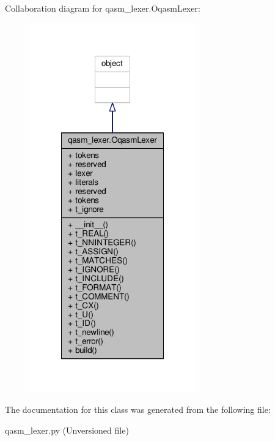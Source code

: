 Collaboration diagram for qasm\-\_\-lexer.\-Oqasm\-Lexer\-:
\nopagebreak
\begin{figure}[H]
\begin{center}
\leavevmode
\includegraphics[width=204pt]{d8/dcd/classqasm__lexer_1_1OqasmLexer__coll__graph}
\end{center}
\end{figure}


The documentation for this class was generated from the following file\-:\begin{DoxyCompactItemize}
\item 
qasm\-\_\-lexer.\-py (\-Unversioned file)\end{DoxyCompactItemize}
